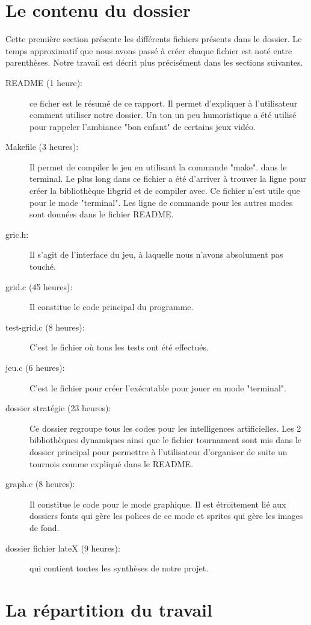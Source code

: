 \documentclass{report}
\begin{document}
\section{Le contenu du dossier}
Cette première section présente les différents fichiers présents dans le dossier. Le temps approximatif que nous avons passé à créer chaque fichier est noté entre parenthèses. Notre travail est décrit plus précisément dans les sections suivantes.\\
\begin{description}
\item [README (1 heure):] ce ficher est le résumé de ce rapport. Il permet d'expliquer à l'utilisateur comment utiliser notre dossier. Un ton un peu humoristique a été utilisé pour rappeler l'ambiance "bon enfant" de certains jeux vidéo.
\item[Makefile (3 heures):] Il permet de compiler le jeu en utilisant la commande "make". dans le terminal. Le plus long dans ce fichier a été d'arriver à trouver la ligne pour créer la bibliothèque libgrid et de compiler avec. Ce fichier n'est utile que pour le mode "terminal". Les ligne de commande pour les autres modes sont données dans le fichier README.
\item[gric.h:] Il s'agit de l'interface du jeu, à laquelle nous n'avons absolument pas touché.
\item[grid.c (45 heures):] Il constitue le code principal du programme. 
\item[test-grid.c (8 heures):] C'est le fichier où tous les tests ont été effectués.
\item[jeu.c (6 heures):] C'est le fichier pour créer l'exécutable pour jouer en mode "terminal".
\item[dossier stratégie (23 heures):] Ce dossier regroupe tous les codes pour les intelligences artificielles. Les 2 bibliothèques dynamiques ainsi que le fichier tournament sont mis dans le dossier principal pour permettre à l'utilisateur d'organiser de suite un tournois comme expliqué dans le README.
\item[graph.c (8 heures):] Il constitue le code pour le mode graphique. Il est étroitement lié aux dossiers fonts qui gère les polices de ce mode et sprites qui gère les images de fond.
\item[dossier fichier lateX (9 heures):] qui contient toutes les synthèses de notre projet.
\end{description}

\section{La répartition du travail}
\end{document}
